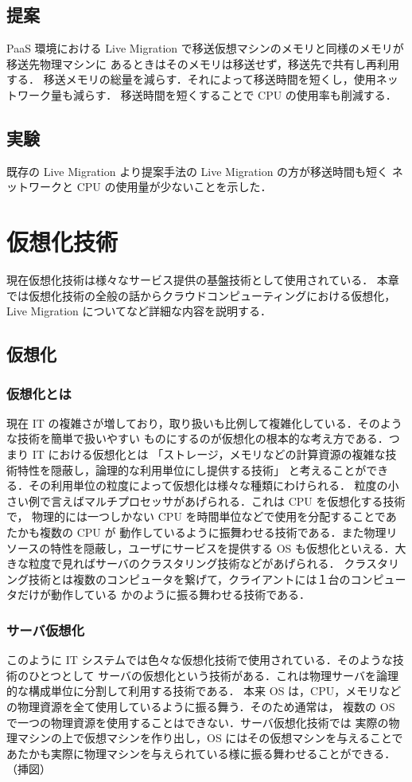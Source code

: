 \documentclass[graduation-thesis]{mlarticle}
\begin{document}
\subsection{提案}
\label{sec-1-3}
PaaS 環境における Live Migration で移送仮想マシンのメモリと同様のメモリが移送先物理マシンに
あるときはそのメモリは移送せず，移送先で共有し再利用する．
移送メモリの総量を減らす．それによって移送時間を短くし，使用ネットワーク量も減らす．
移送時間を短くすることで CPU の使用率も削減する．

\subsection{実験}
\label{sec-1-4}
既存の Live Migration より提案手法の Live Migration の方が移送時間も短く
ネットワークと CPU の使用量が少ないことを示した．

\clearpage
\section{仮想化技術}
\label{sec-2}
現在仮想化技術は様々なサービス提供の基盤技術として使用されている．
本章では仮想化技術の全般の話からクラウドコンピューティングにおける仮想化，Live Migration 
についてなど詳細な内容を説明する．
\subsection{仮想化}
\label{sec-2-1}
\subsubsection{仮想化とは}
\label{sec-2-1-1}
現在 IT の複雑さが増しており，取り扱いも比例して複雑化している．そのような技術を簡単で扱いやすい
ものにするのが仮想化の根本的な考え方である．つまり IT における仮想化とは
「ストレージ，メモリなどの計算資源の複雑な技術特性を隠蔽し，論理的な利用単位にし提供する技術」
と考えることができる．その利用単位の粒度によって仮想化は様々な種類にわけられる．
粒度の小さい例で言えばマルチプロセッサがあげられる．これは CPU を仮想化する技術で，
物理的には一つしかない CPU を時間単位などで使用を分配することであたかも複数の CPU が
動作しているように振舞わせる技術である．また物理リソースの特性を隠蔽し，ユーザにサービスを提供する
OS も仮想化といえる．大きな粒度で見ればサーバのクラスタリング技術などがあげられる．
クラスタリング技術とは複数のコンピュータを繋げて，クライアントには１台のコンピュータだけが動作している
かのように振る舞わせる技術である．
\subsubsection{サーバ仮想化}
\label{sec-2-1-2}
このように IT システムでは色々な仮想化技術で使用されている．そのような技術のひとつとして
サーバの仮想化という技術がある．これは物理サーバを論理的な構成単位に分割して利用する技術である．
本来 OS は，CPU，メモリなどの物理資源を全て使用しているように振る舞う．そのため通常は，
複数の OS で一つの物理資源を使用することはできない．サーバ仮想化技術では
実際の物理マシンの上で仮想マシンを作り出し，OS にはその仮想マシンを与えることで
あたかも実際に物理マシンを与えられている様に振る舞わせることができる．（挿図）
\end{document}
